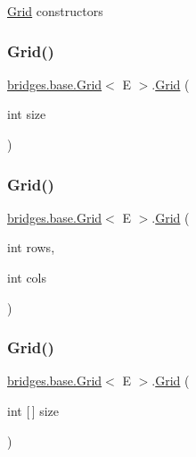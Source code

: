 \mbox{\hyperlink{classbridges_1_1base_1_1_grid}{Grid}} constructors \mbox{\label{classbridges_1_1base_1_1_grid_a9818d4959813f1292c6a234bc6f6aa9e}} 
\subsubsection{\texorpdfstring{Grid()}{Grid()}\hspace{0.1cm}{\footnotesize\ttfamily [2/4]}}
{\footnotesize\ttfamily \mbox{\hyperlink{classbridges_1_1base_1_1_grid}{bridges.\+base.\+Grid}}$<$ E $>$.\mbox{\hyperlink{classbridges_1_1base_1_1_grid}{Grid}} (\begin{DoxyParamCaption}\item[{int}]{size }\end{DoxyParamCaption})}

\mbox{\label{classbridges_1_1base_1_1_grid_a43a699bd7ae2c6c986f978c515ff97d8}} 
\subsubsection{\texorpdfstring{Grid()}{Grid()}\hspace{0.1cm}{\footnotesize\ttfamily [3/4]}}
{\footnotesize\ttfamily \mbox{\hyperlink{classbridges_1_1base_1_1_grid}{bridges.\+base.\+Grid}}$<$ E $>$.\mbox{\hyperlink{classbridges_1_1base_1_1_grid}{Grid}} (\begin{DoxyParamCaption}\item[{int}]{rows,  }\item[{int}]{cols }\end{DoxyParamCaption})}

\mbox{\label{classbridges_1_1base_1_1_grid_ab9975b28d8dda7f3fbe0e35a7a026772}} 
\subsubsection{\texorpdfstring{Grid()}{Grid()}\hspace{0.1cm}{\footnotesize\ttfamily [4/4]}}
{\footnotesize\ttfamily \mbox{\hyperlink{classbridges_1_1base_1_1_grid}{bridges.\+base.\+Grid}}$<$ E $>$.\mbox{\hyperlink{classbridges_1_1base_1_1_grid}{Grid}} (\begin{DoxyParamCaption}\item[{int \mbox{[}$\,$\mbox{]}}]{size }\end{DoxyParamCaption})}



